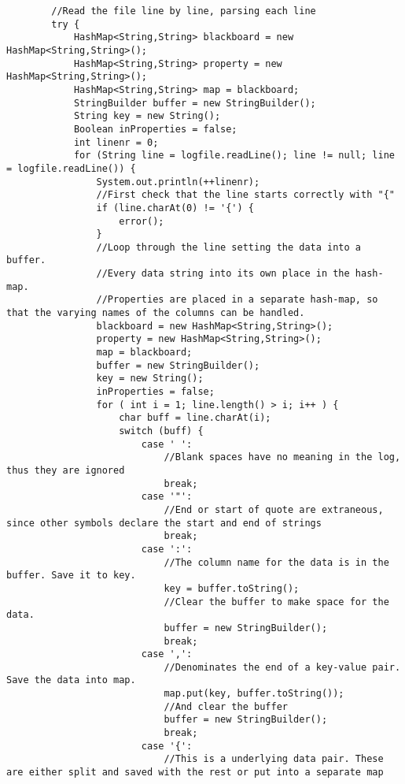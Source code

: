 \begin{lstlisting}
        //Read the file line by line, parsing each line
        try {
            HashMap<String,String> blackboard = new HashMap<String,String>();
            HashMap<String,String> property = new HashMap<String,String>();
            HashMap<String,String> map = blackboard;
            StringBuilder buffer = new StringBuilder();
            String key = new String();
            Boolean inProperties = false;
            int linenr = 0;
            for (String line = logfile.readLine(); line != null; line = logfile.readLine()) {
                System.out.println(++linenr);
                //First check that the line starts correctly with "{"
                if (line.charAt(0) != '{') {
                    error();
                }
                //Loop through the line setting the data into a buffer.
                //Every data string into its own place in the hash-map.
                //Properties are placed in a separate hash-map, so that the varying names of the columns can be handled.
                blackboard = new HashMap<String,String>();
                property = new HashMap<String,String>();
                map = blackboard;
                buffer = new StringBuilder();
                key = new String();
                inProperties = false;
                for ( int i = 1; line.length() > i; i++ ) {
                    char buff = line.charAt(i);
                    switch (buff) {
                        case ' ':
                            //Blank spaces have no meaning in the log, thus they are ignored
                            break;
                        case '"':
                            //End or start of quote are extraneous, since other symbols declare the start and end of strings
                            break;
                        case ':':
                            //The column name for the data is in the buffer. Save it to key.
                            key = buffer.toString();
                            //Clear the buffer to make space for the data.
                            buffer = new StringBuilder();
                            break;
                        case ',':
                            //Denominates the end of a key-value pair. Save the data into map.
                            map.put(key, buffer.toString());
                            //And clear the buffer
                            buffer = new StringBuilder();
                            break;
                        case '{':
                            //This is a underlying data pair. These are either split and saved with the rest or put into a separate map

\end{lstlisting}
